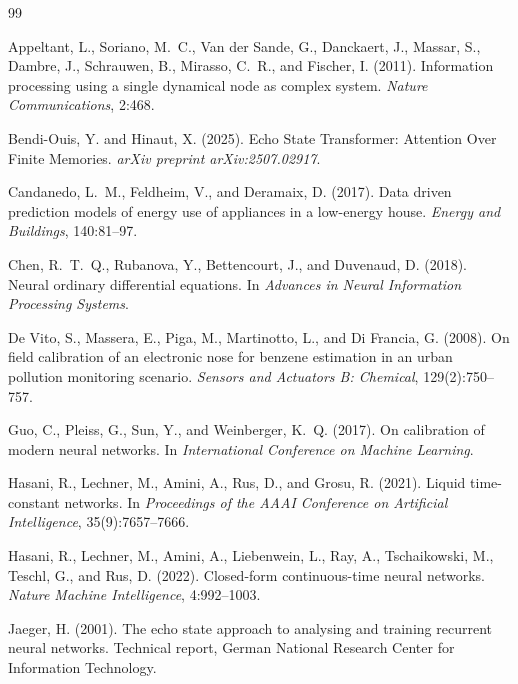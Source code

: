 \documentclass[preprint,12pt,authoryear]{elsarticle}
\begin{document}
\begin{thebibliography}{99}

Appeltant, L., Soriano, M.~C., Van der Sande, G., Danckaert, J., Massar, S., Dambre, J., Schrauwen, B., Mirasso, C.~R., and Fischer, I. (2011).
Information processing using a single dynamical node as complex system.
\emph{Nature Communications}, 2:468.


Bendi-Ouis, Y. and Hinaut, X. (2025).
Echo State Transformer: Attention Over Finite Memories.
\emph{arXiv preprint arXiv:2507.02917}.

Candanedo, L.~M., Feldheim, V., and Deramaix, D. (2017).
Data driven prediction models of energy use of appliances in a low-energy house.
\emph{Energy and Buildings}, 140:81--97.

Chen, R.~T.~Q., Rubanova, Y., Bettencourt, J., and Duvenaud, D. (2018).
Neural ordinary differential equations.
In \emph{Advances in Neural Information Processing Systems}.

De Vito, S., Massera, E., Piga, M., Martinotto, L., and Di Francia, G. (2008).
On field calibration of an electronic nose for benzene estimation in an urban pollution monitoring scenario.
\emph{Sensors and Actuators B: Chemical}, 129(2):750--757.

Guo, C., Pleiss, G., Sun, Y., and Weinberger, K.~Q. (2017).
On calibration of modern neural networks.
In \emph{International Conference on Machine Learning}.

Hasani, R., Lechner, M., Amini, A., Rus, D., and Grosu, R. (2021).
Liquid time-constant networks.
In \emph{Proceedings of the AAAI Conference on Artificial Intelligence}, 35(9):7657--7666.

Hasani, R., Lechner, M., Amini, A., Liebenwein, L., Ray, A., Tschaikowski, M., Teschl, G., and Rus, D. (2022).
Closed-form continuous-time neural networks.
\emph{Nature Machine Intelligence}, 4:992--1003.

Jaeger, H. (2001).
The echo state approach to analysing and training recurrent neural networks.
Technical report, German National Research Center for Information Technology.


\end{thebibliography}
\end{document}
